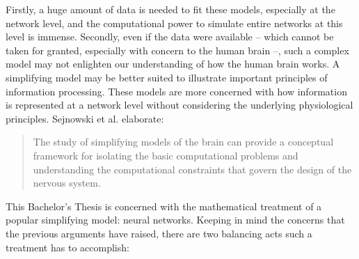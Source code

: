 \documentclass[a4paper,11pt]{report}
\begin{document}
Firstly, a huge amount of data is needed to fit these models, especially at the network level, and the computational power to simulate entire networks at this level is immense. Secondly, even if the data were available -- which cannot be taken for granted, especially with concern to the human brain --, such a complex model may not enlighten our understanding of how the human brain works. A simplifying model may be better suited to illustrate important principles of information processing. These models are more concerned with how information is represented at a network level without considering the underlying physiological principles. Sejnowski et al. elaborate:
\begin{quote}
The study of simplifying models of the brain can provide a conceptual framework for isolating the basic computational problems and understanding the computational constraints that govern the design of the nervous system. \cite[][1300]{Sejnowski1988}
\end{quote}
This Bachelor's Thesis is concerned with the mathematical treatment of a popular simplifying model: neural networks. Keeping in mind the concerns that the previous arguments have raised, there are two balancing acts such a treatment has to accomplish:
\end{document}
